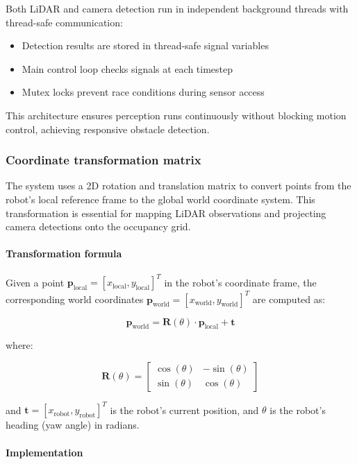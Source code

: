 \documentclass{article}
\begin{document}
Both LiDAR and camera detection run in independent background threads with thread-safe communication:
\begin{itemize}
    \item Detection results are stored in thread-safe signal variables
    \item Main control loop checks signals at each timestep
    \item Mutex locks prevent race conditions during sensor access
\end{itemize}

This architecture ensures perception runs continuously without blocking motion control, achieving responsive obstacle detection.

\subsubsection{Coordinate transformation matrix}

The system uses a 2D rotation and translation matrix to convert points from the robot's local reference frame to the global world coordinate system. This transformation is essential for mapping LiDAR observations and projecting camera detections onto the occupancy grid.

\paragraph{Transformation formula}

Given a point $\mathbf{p}_{\text{local}} = [x_{\text{local}}, y_{\text{local}}]^T$ in the robot's coordinate frame, the corresponding world coordinates $\mathbf{p}_{\text{world}} = [x_{\text{world}}, y_{\text{world}}]^T$ are computed as:

$$
\mathbf{p}_{\text{world}} = \mathbf{R}(\theta) \cdot \mathbf{p}_{\text{local}} + \mathbf{t}
$$

\noindent where:

$$
\mathbf{R}(\theta) = \begin{bmatrix}
\cos(\theta) & -\sin(\theta) \\
\sin(\theta) & \cos(\theta)
\end{bmatrix}
$$

\noindent and $\mathbf{t} = [x_{\text{robot}}, y_{\text{robot}}]^T$ is the robot's current position, and $\theta$ is the robot's heading (yaw angle) in radians.

\paragraph{Implementation}
\end{document}
